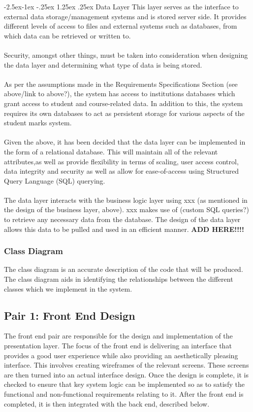 \documentclass[paper=a4, fontsize=11pt]{scrartcl}
\makeatletter
\numberwithin{equation}{section}		%
\numberwithin{figure}{section}			%
\numberwithin{table}{section}				%
\renewcommand\paragraph{\@startsection{paragraph}{4}{\z@}%
            {-2.5ex\@plus -1ex \@minus -.25ex}%
            {1.25ex \@plus .25ex}%
            {\normalfont\normalsize\bfseries}}
\makeatother
\begin{document}
\paragraph{Data Layer}
This layer serves as the interface to external data storage/management systems and is stored server side. It provides different levels of access to files and external systems such as databases, from which data can be retrieved or written to.\\\\Security, amongst other things, must be taken into consideration when designing the data layer and determining what type of data is being stored.\\\\As per the assumptions made in the Requirements Specifications Section (see above/link to above?), the system has access to institutions databases which grant access to student and course-related data. In addition to this, the system requires its own databases to act as persistent storage for various aspects of the student marks system.\\\\Given the above, it has been decided that the data layer can be implemented in the form of a relational database. This will maintain all of the relevant attributes,as well as provide flexibility in terms of scaling, user access control, data integrity and security as well as allow for ease-of-access using Structured Query Language (SQL) querying.\\\\The data layer interacts with the business logic layer using xxx (as mentioned in the design of the business layer, above). xxx makes use of (custom SQL queries?) to retrieve any necessary data from the database. The design of the data layer allows this data to be pulled and used in an efficient manner. \huge\textbf{ADD HERE!!!!}\normalsize

\subsubsection{Class Diagram}
The class diagram is an accurate description of the code that will be produced. The class diagram aids in identifying the relationships between the different classes which we implement in the system.


\subsection{Pair 1: Front End Design}
The front end pair are responsible for the design and implementation of the presentation layer. The focus of the front end is delivering an interface that provides a good user experience while also providing an aesthetically pleasing interface. This involves creating wireframes of the relevant screens. These screens are then turned into an actual interface design. Once the design is complete, it is checked to ensure that key system logic can be implemented so as to satisfy the functional and non-functional requirements relating to it. After the front end is completed, it is then integrated with the back end, described below.
\end{document}

